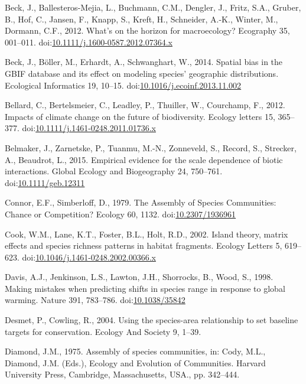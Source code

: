 \hypertarget{ref-Beck2012}{}
Beck, J., Ballesteros-Mejia, L., Buchmann, C.M., Dengler, J., Fritz,
S.A., Gruber, B., Hof, C., Jansen, F., Knapp, S., Kreft, H., Schneider,
A.-K., Winter, M., Dormann, C.F., 2012. What's on the horizon for
macroecology? Ecography 35, 001--011.
doi:\href{https://doi.org/10.1111/j.1600-0587.2012.07364.x}{10.1111/j.1600-0587.2012.07364.x}

\hypertarget{ref-Beck2014a}{}
Beck, J., Böller, M., Erhardt, A., Schwanghart, W., 2014. Spatial bias
in the GBIF database and its effect on modeling species' geographic
distributions. Ecological Informatics 19, 10--15.
doi:\href{https://doi.org/10.1016/j.ecoinf.2013.11.002}{10.1016/j.ecoinf.2013.11.002}

\hypertarget{ref-Bellard2012}{}
Bellard, C., Bertelsmeier, C., Leadley, P., Thuiller, W., Courchamp, F.,
2012. Impacts of climate change on the future of biodiversity. Ecology
letters 15, 365--377.
doi:\href{https://doi.org/10.1111/j.1461-0248.2011.01736.x}{10.1111/j.1461-0248.2011.01736.x}

\hypertarget{ref-Belmaker2015}{}
Belmaker, J., Zarnetske, P., Tuanmu, M.-N., Zonneveld, S., Record, S.,
Strecker, A., Beaudrot, L., 2015. Empirical evidence for the scale
dependence of biotic interactions. Global Ecology and Biogeography 24,
750--761.
doi:\href{https://doi.org/10.1111/geb.12311}{10.1111/geb.12311}

\hypertarget{ref-Connor1979}{}
Connor, E.F., Simberloff, D., 1979. The Assembly of Species Communities:
Chance or Competition? Ecology 60, 1132.
doi:\href{https://doi.org/10.2307/1936961}{10.2307/1936961}

\hypertarget{ref-Cook2002}{}
Cook, W.M., Lane, K.T., Foster, B.L., Holt, R.D., 2002. Island theory,
matrix effects and species richness patterns in habitat fragments.
Ecology Letters 5, 619--623.
doi:\href{https://doi.org/10.1046/j.1461-0248.2002.00366.x}{10.1046/j.1461-0248.2002.00366.x}

\hypertarget{ref-Davis1998}{}
Davis, A.J., Jenkinson, L.S., Lawton, J.H., Shorrocks, B., Wood, S.,
1998. Making mistakes when predicting shifts in species range in
response to global warming. Nature 391, 783--786.
doi:\href{https://doi.org/10.1038/35842}{10.1038/35842}

\hypertarget{ref-Desmet2004}{}
Desmet, P., Cowling, R., 2004. Using the species-area relationship to
set baseline targets for conservation. Ecology And Society 9, 1--39.

\hypertarget{ref-Diamond1975}{}
Diamond, J.M., 1975. Assembly of species communities, in: Cody, M.L.,
Diamond, J.M. (Eds.), Ecology and Evolution of Communities. Harvard
University Press, Cambridge, Massachusetts, USA., pp. 342--444.

